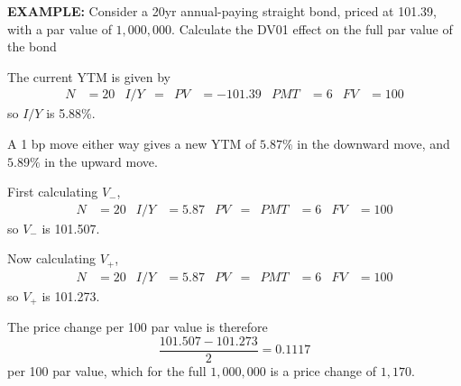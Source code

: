 \documentclass[../notes_compiled.tex]{subfiles}
\begin{document}
\begin{itemize}
{}


{\color{RedViolet}
\item[] \textbf{EXAMPLE:} Consider a 20yr annual-paying straight bond, priced at 101.39, with a par value of $1,000,000$. Calculate the DV01 effect on the full par value of the bond
}

{\color{RoyalBlue}
The current YTM is given by 
\begin{align*}
N&=20  & I / Y &= & PV &=-101.39 & PMT &=6 & FV &=100
\end{align*}
so $I / Y$ is 5.88\%.
\item[] A 1 bp move either way gives a new YTM of $5.87\%$ in the downward move, and $5.89\%$ in the upward move.
\item[] First calculating $V_{-}$,
\begin{align*}
N&=20  & I / Y &=5.87 & PV &= & PMT &=6 & FV &=100
\end{align*}
so $V_{-}$ is 101.507.

\item[] Now calculating $V_{+}$,
\begin{align*}
N&=20  & I / Y &=5.87 & PV &= & PMT &=6 & FV &=100
\end{align*}
so $V_{+}$ is 101.273.

\item[] The price change per 100 par value is therefore
\begin{equation*}
\frac{101.507 - 101.273}{2} = 0.1117
\end{equation*}
per 100 par value, which for the full $1,000,000$ is a price change of $1,170$.
}


\end{itemize}
\end{document}
